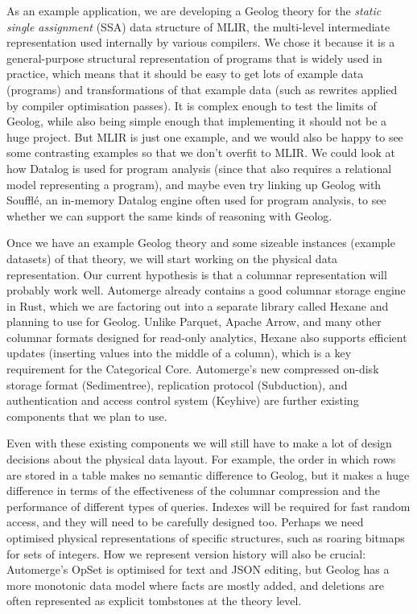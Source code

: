 \documentclass{article}
\begin{document}
As an example application, we are developing a Geolog theory for the \emph{static single assignment} (SSA) data structure of MLIR, the multi-level intermediate representation used internally by various compilers.
We chose it because it is a general-purpose structural representation of programs that is widely used in practice, which means that it should be easy to get lots of example data (programs) and transformations of that example data (such as rewrites applied by compiler optimisation passes).
It is complex enough to test the limits of Geolog, while also being simple enough that implementing it should not be a huge project.
But MLIR is just one example, and we would also be happy to see some contrasting examples so that we don't overfit to MLIR.
We could look at how Datalog is used for program analysis (since that also requires a relational model representing a program), and maybe even try linking up Geolog with Soufflé, an in-memory Datalog engine often used for program analysis, to see whether we can support the same kinds of reasoning with Geolog.

Once we have an example Geolog theory and some sizeable instances (example datasets) of that theory, we will start working on the physical data representation.
Our current hypothesis is that a columnar representation \citep{stonebraker-2005-c-store,abadi-2013-columnar} will probably work well.
Automerge already contains a good columnar storage engine in Rust, which we are factoring out into a separate library called Hexane and planning to use for Geolog.
Unlike Parquet, Apache Arrow, and many other columnar formats designed for read-only analytics, Hexane also supports efficient updates (inserting values into the middle of a column), which is a key requirement for the Categorical Core.
Automerge's new compressed on-disk storage format (Sedimentree), replication protocol (Subduction), and authentication and access control system (Keyhive) are further existing components that we plan to use.

Even with these existing components we will still have to make a lot of design decisions about the physical data layout.
For example, the order in which rows are stored in a table makes no semantic difference to Geolog, but it makes a huge difference in terms of the effectiveness of the columnar compression and the performance of different types of queries.
Indexes will be required for fast random access, and they will need to be carefully designed too.
Perhaps we need optimised physical representations of specific structures, such as roaring bitmaps for sets of integers.
How we represent version history will also be crucial: Automerge's OpSet is optimised for text and JSON editing, but Geolog has a more monotonic data model where facts are mostly added, and deletions are often represented as explicit tombstones at the theory level.
\end{document}
